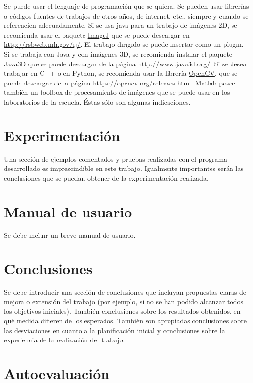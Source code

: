 \documentclass[a4paper]{article}
\begin{document}
Se puede usar el lenguaje de programación que se quiera. Se pueden usar librerías o códigos fuentes de trabajos de otros años, de internet, etc., siempre y cuando se referencien adecuadamente. Si se usa java para un trabajo de imágenes 2D, se recomienda usar el paquete \url{ImageJ} que se puede descargar en \url{http://rsbweb.nih.gov/ij/}. El trabajo dirigido se puede insertar como un plugin. Si se trabaja con Java y con imágenes 3D, se recomienda instalar el paquete Java3D que se puede descargar de la página \url{http://www.java3d.org/}. Si se desea trabajar en C++ o en Python, se recomienda usar la librería \url{OpenCV}, que se puede descargar de la página \url{https://opencv.org/releases.html}. Matlab posee también un toolbox de procesamiento de imágenes que se puede usar en los laboratorios de la escuela. Éstas sólo son algunas indicaciones.



\section{Experimentación}

Una sección de ejemplos comentados y pruebas realizadas con el programa desarrollado es imprescindible en este trabajo. Igualmente importantes serán las conclusiones que se puedan obtener de la experimentación realizada. 


\section{Manual de usuario}

Se debe incluir un breve manual de usuario. 

\section{Conclusiones}

Se debe introducir una sección de conclusiones que incluyan propuestas claras de mejora o extensión del trabajo (por ejemplo, si no se han podido alcanzar todos los objetivos iniciales). También conclusiones sobre los resultados obtenidos, en qué medida difieren de los esperados. También son apropiadas conclusiones sobre las desviaciones en cuanto a la planificación inicial y conclusiones sobre la experiencia de la realización del trabajo.

\section{Autoevaluación}
\end{document}
